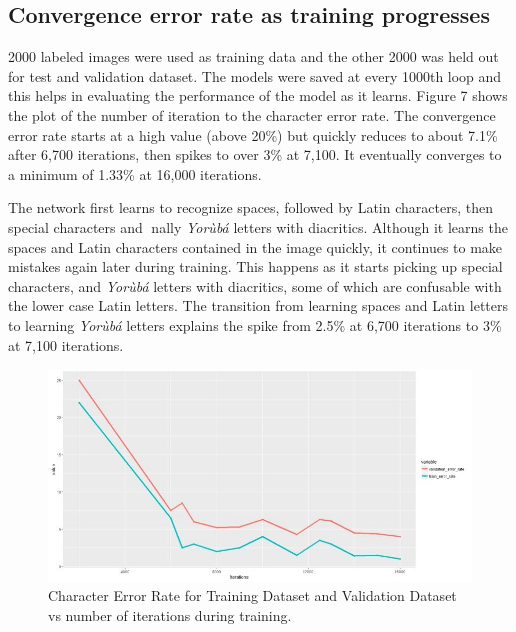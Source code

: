 \documentclass[review]{elsarticle}
\newcommand{\yor}{\textit{Yor\`ub\'a }}
\begin{document}
\subsection{Convergence error rate as training progresses}
2000 labeled images were used as training data and the other 2000 was held out for test and validation dataset. The models were saved at every 1000th loop and this helps in evaluating the performance of the model as it learns. Figure 7 shows the plot of the number of iteration to the character error rate. The convergence error rate starts at a high value (above 20\%) but quickly reduces to about 7.1\% after 6,700 iterations, then spikes to over 3\% at 7,100. It eventually converges to a minimum of 1.33\% at 16,000 iterations.

The network first learns to recognize spaces, followed by Latin characters,
then special characters and nally \yor letters with diacritics. Although it learns the spaces and Latin characters contained in the image quickly, it
continues to make mistakes again later during training. This happens as it
starts picking up special characters, and \yor letters with diacritics, some
of which are confusable with the lower case Latin letters. The transition from learning spaces and Latin letters to learning \yor letters explains the spike from 2.5\% at 6,700 iterations to 3\% at 7,100 iterations.

\begin{figure}[H]
	\centering
	\includegraphics[width=1.1\linewidth]{trainvalidation}
	\caption{Character Error Rate for Training Dataset and Validation
		Dataset vs number of iterations during training.}
	\label{fig:trainvalidation}
\end{figure}
\end{document}

